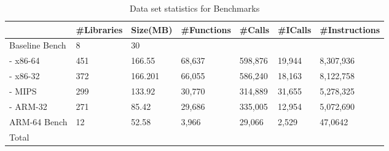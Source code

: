 \documentclass[acmsmall,screen,review,anonymous]{acmart} %
\begin{document}
\renewcommand\arraystretch{1.31}
\begin{table}[tb]
  \centering
  \footnotesize
  \caption{Data set statistics for Benchmarks}\label{table:data}
    \begin{tabular}{p{2cm}p{1cm}p{1cm}p{1cm}p{1cm}p{1cm}p{1.6cm}}
   \toprule
    & \#Libraries & Size(MB)  & \#Functions & \#Calls & \#ICalls & \#Instructions \\
    \hline
    Baseline Bench  & 8 & 30\\
    - x86-64 & 451  & 166.55   & 68,637 & 598,876 & 19,944 & 8,307,936 \\
    - x86-32 &372   & 166.201  & 66,055 & 586,240 & 18,163 & 8,122,758\\
    - MIPS   &299   & 133.92   & 30,770 & 314,889 & 31,655 & 5,278,325\\
    - ARM-32 &271   & 85.42    & 29,686 & 335,005 & 12,954 & 5,072,690\\
    \hline
    ARM-64 Bench & 12 & 52.58  & 3,966  & 29,066  & 2,529  & 47,0642  \\
    \hline
    Total & & & & & &\\
    \bottomrule
  \end{tabular}
  \vspace{-0.2in}
\end{table}
\renewcommand\arraystretch{1.0}


\end{document}

